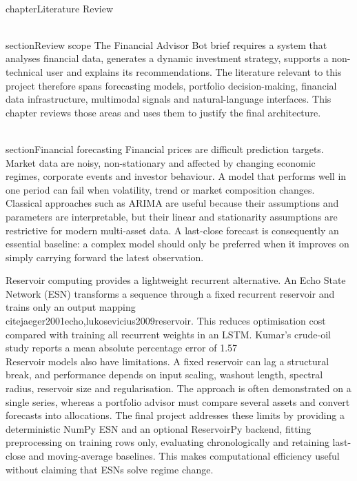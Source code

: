 \\chapter{Literature Review}

\\section{Review scope}
The Financial Advisor Bot brief requires a system that analyses financial data, generates a dynamic investment strategy, supports a non-technical user and explains its recommendations. The literature relevant to this project therefore spans forecasting models, portfolio decision-making, financial data infrastructure, multimodal signals and natural-language interfaces. This chapter reviews those areas and uses them to justify the final architecture.

\\section{Financial forecasting}
Financial prices are difficult prediction targets. Market data are noisy, non-stationary and affected by changing economic regimes, corporate events and investor behaviour. A model that performs well in one period can fail when volatility, trend or market composition changes. Classical approaches such as ARIMA are useful because their assumptions and parameters are interpretable, but their linear and stationarity assumptions are restrictive for modern multi-asset data. A last-close forecast is consequently an essential baseline: a complex model should only be preferred when it improves on simply carrying forward the latest observation.

Reservoir computing provides a lightweight recurrent alternative. An Echo State Network (ESN) transforms a sequence through a fixed recurrent reservoir and trains only an output mapping \\cite{jaeger2001echo,lukosevicius2009reservoir}. This reduces optimisation cost compared with training all recurrent weights in an LSTM. Kumar's crude-oil study reports a mean absolute percentage error of 1.57\\%

Reservoir models also have limitations. A fixed reservoir can lag a structural break, and performance depends on input scaling, washout length, spectral radius, reservoir size and regularisation. The approach is often demonstrated on a single series, whereas a portfolio advisor must compare several assets and convert forecasts into allocations. The final project addresses these limits by providing a deterministic NumPy ESN and an optional ReservoirPy backend, fitting preprocessing on training rows only, evaluating chronologically and retaining last-close and moving-average baselines. This makes computational efficiency useful without claiming that ESNs solve regime change.

